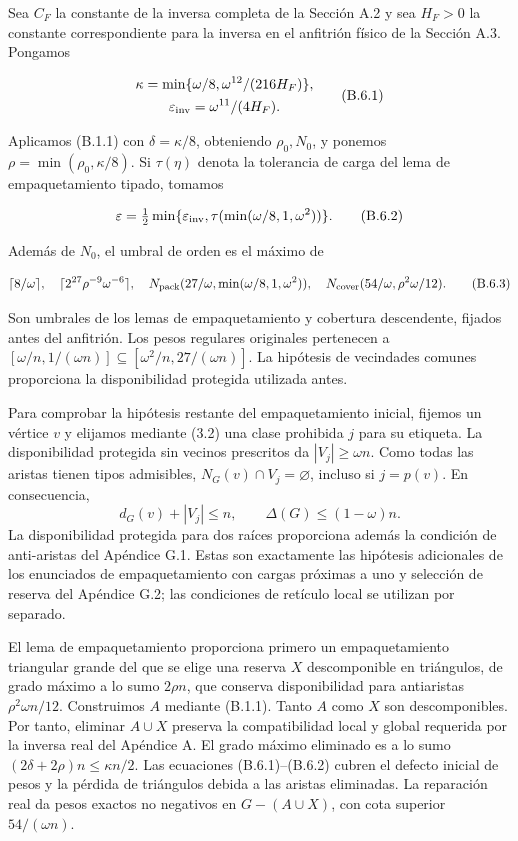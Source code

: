 \documentclass[spanish,11pt,a4paper]{article}
\begin{document}
Sea \(C_F\) la constante de la inversa completa de la Sección A.2 y sea \(H_F>0\) la constante correspondiente para la inversa en el anfitrión físico de la Sección A.3. Pongamos

\[\begin{gathered}
\kappa=\min\{\omega/8,\omega^{12}/(216H_F)\},\\
\varepsilon_{\rm inv}=\omega^{11}/(4H_F).
\end{gathered}
\tag{B.6.1}\]

Aplicamos (B.1.1) con \(\delta=\kappa/8\), obteniendo \(\rho_0,N_0\), y ponemos \(\rho=\min(\rho_0,\kappa/8)\). Si \(\tau(\eta)\) denota la tolerancia de carga del lema de empaquetamiento tipado, tomamos

\[\varepsilon=\tfrac12\min\{\varepsilon_{\rm inv},
\tau(\min(\omega/8,1,\omega^2))\}.
\tag{B.6.2}\]

Además de \(N_0\), el umbral de orden es el máximo de

\[\lceil8/\omega\rceil,\quad
\lceil2^{27}\rho^{-9}\omega^{-6}\rceil,\quad
N_{\rm pack}(27/\omega,\min(\omega/8,1,\omega^2)),\quad
N_{\rm cover}(54/\omega,\rho^2\omega/12).
\tag{B.6.3}\]

Son umbrales de los lemas de empaquetamiento y cobertura descendente, fijados antes del anfitrión. Los pesos regulares originales pertenecen a \([\omega/n,1/(\omega n)]\subseteq[\omega^2/n,27/(\omega n)]\). La hipótesis de vecindades comunes proporciona la disponibilidad protegida utilizada antes.

Para comprobar la hipótesis restante del empaquetamiento inicial, fijemos un vértice \(v\) y elijamos mediante (3.2) una clase prohibida \(j\) para su etiqueta. La disponibilidad protegida sin vecinos prescritos da \(|V_j|\ge\omega n\). Como todas las aristas tienen tipos admisibles, \(N_G(v)\cap V_j=\varnothing\), incluso si \(j=p(v)\). En consecuencia, \[d_G(v)+|V_j|\le n,\qquad \Delta(G)\le(1-\omega)n.\] La disponibilidad protegida para dos raíces proporciona además la condición de anti-aristas del Apéndice G.1. Estas son exactamente las hipótesis adicionales de los enunciados de empaquetamiento con cargas próximas a uno y selección de reserva del Apéndice G.2; las condiciones de retículo local se utilizan por separado.

El lema de empaquetamiento proporciona primero un empaquetamiento triangular grande del que se elige una reserva \(X\) descomponible en triángulos, de grado máximo a lo sumo \(2\rho n\), que conserva disponibilidad para antiaristas \(\rho^2\omega n/12\). Construimos \(A\) mediante (B.1.1). Tanto \(A\) como \(X\) son descomponibles. Por tanto, eliminar \(A\cup X\) preserva la compatibilidad local y global requerida por la inversa real del Apéndice A. El grado máximo eliminado es a lo sumo \((2\delta+2\rho)n\le\kappa n/2\). Las ecuaciones (B.6.1)--(B.6.2) cubren el defecto inicial de pesos y la pérdida de triángulos debida a las aristas eliminadas. La reparación real da pesos exactos no negativos en \(G-(A\cup X)\), con cota superior \(54/(\omega n)\).
\end{document}
